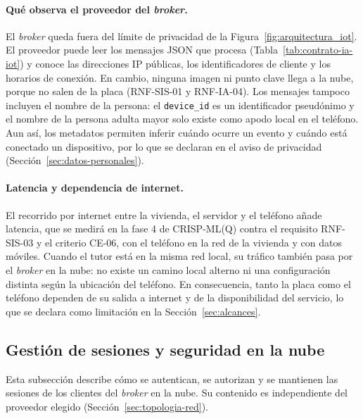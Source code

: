 \documentclass[12pt,a4paper,oneside]{book}
\theoremstyle{plain}
\theoremstyle{definition}
\theoremstyle{remark}
\begin{document}
\paragraph{Qué observa el proveedor del \textit{broker}.} El \textit{broker} queda fuera del límite de privacidad de la Figura~\ref{fig:arquitectura_iot}. El proveedor puede leer los mensajes JSON que procesa (Tabla~\ref{tab:contrato-ia-iot}) y conoce las direcciones IP públicas, los identificadores de cliente y los horarios de conexión. En cambio, ninguna imagen ni punto clave llega a la nube, porque no salen de la placa (RNF-SIS-01 y RNF-IA-04). Los mensajes tampoco incluyen el nombre de la persona: el \texttt{device\_id} es un identificador pseudónimo y el nombre de la persona adulta mayor solo existe como apodo local en el teléfono. Aun así, los metadatos permiten inferir cuándo ocurre un evento y cuándo está conectado un dispositivo, por lo que se declaran en el aviso de privacidad (Sección~\ref{sec:datos-personales}).

\paragraph{Latencia y dependencia de internet.} El recorrido por internet entre la vivienda, el servidor y el teléfono añade latencia, que se medirá en la fase 4 de CRISP-ML(Q) contra el requisito RNF-SIS-03 y el criterio CE-06, con el teléfono en la red de la vivienda y con datos móviles. Cuando el tutor está en la misma red local, su tráfico también pasa por el \textit{broker} en la nube: no existe un camino local alterno ni una configuración distinta según la ubicación del teléfono. En consecuencia, tanto la placa como el teléfono dependen de su salida a internet y de la disponibilidad del servicio, lo que se declara como limitación en la Sección~\ref{sec:alcances}.

\subsection{Gestión de sesiones y seguridad en la nube}
\label{sec:sesiones-nube}

Esta subsección describe cómo se autentican, se autorizan y se mantienen las sesiones de los clientes del \textit{broker} en la nube. Su contenido es independiente del proveedor elegido (Sección~\ref{sec:topologia-red}).
\end{document}
